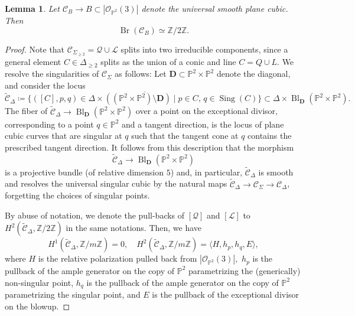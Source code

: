 \documentclass[11pt]{amsart}
\theoremstyle{plain}
\newtheorem{lem}[thm]{Lemma}
\theoremstyle{definition}
\theoremstyle{remark}
\DeclareMathOperator{\Br}{Br}
\DeclareMathOperator{\Sing}{Sing}
\DeclareMathOperator{\Bl}{Bl}
\begin{document}
\begin{lem}\label{lem: appendixc0}
    Let $\mathcal C_B \to B \subset |\mathcal O_{\mathbb P^2}(3)|$ denote the universal smooth plane cubic. Then
    $$\Br(\mathcal C_B) \simeq \mathbb Z/2\mathbb Z.$$
\end{lem}
\begin{proof}

Note that ${\mathcal C}_{\Sigma_{\geq 2}} = \mathcal Q \cup \mathcal L$ splits into two irreducible components, since a general element $C \in \Delta_{\geq 2}$ splits as the union of a conic and line $C = Q \cup L$. We resolve the singularities of $\mathcal{C}_\Sigma$ as follows: Let $\mathbf{D} \subset \mathbb P^2 \times \mathbb P^2$ denote the diagonal, and consider the locus
$$\widetilde{\mathcal C}_{\Delta} \coloneq\overline{\{([C], p, q) \in \Delta \times ((\mathbb P^2 \times \mathbb P^2) \setminus \mathbf D) \mid p \in C,\, q \in \Sing(C)\}} \subset \Delta \times \Bl_{\mathbf{D}}(\mathbb P^2 \times \mathbb P^2).$$
The fiber of $\widetilde{\mathcal C}_\Delta \to \Bl_{\mathbf{D}}(\mathbb P^2 \times \mathbb P^2)$ over a point on the exceptional divisor, corresponding to a point $q \in \mathbb P^2$ and a tangent direction, is the locus of plane cubic curves that are singular at $q$ such that the tangent cone at $q$ contains the prescribed tangent direction. It follows from this description that the morphism
$$\widetilde{\mathcal C}_\Delta \to \Bl_{\mathbf D}(\mathbb P^2 \times \mathbb P^2)$$
is a projective bundle (of relative dimension $5$) and, in particular, $\widetilde{\mathcal C}_\Delta$ is smooth and resolves the universal singular cubic by the natural maps $\widetilde{\mathcal C}_{\Delta} \to \mathcal{C}_\Sigma \to \mathcal{C}_\Delta$, forgetting the choices of singular points.

By abuse of notation, we denote the pull-backs of $[\mathcal{Q}]$ and $[\mathcal{L}]$ to $H^2(\widetilde{\mathcal{C}}_\Delta, \mathbb Z/ 2\mathbb Z)$ in the same notations. Then, we have 
\[
H^1(\widetilde{\mathcal C}_{\Delta}, \mathbb Z / m \mathbb Z) = 0,\quad  H^2(\widetilde{\mathcal C}_\Delta, \mathbb Z / m \mathbb Z) = \langle H, h_p, h_q, E \rangle,
\]
where $H$ is the relative polarization pulled back from $|\mathcal O_{\mathbb P^2}(3)|,$ $h_p$ is the pullback of the ample generator on the copy of $\mathbb P^2$ parametrizing the (generically) non-singular point, $h_q$ is the pullback of the ample generator on the copy of $\mathbb P^2$ parametrizing the singular point, and $E$ is the pullback of the exceptional divisor on the blowup.


\end{proof}
\end{document}
